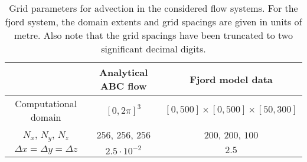 \begin{table}[htpb]
    \centering
    \caption[Grid parameters for advection in the considered flow systems]
    {Grid parameters for advection in the considered flow systems. For the
        fjord system, the domain extents and grid spacings are given in
        units of metre. Also note that the grid spacings have been truncated
        to two significant decimal digits.
    }
    \label{tab:gridparams}
    \begin{tabular}{ccc}
        \toprule
        & Analytical ABC flow & Fjord model data\\
        \midrule
        Computational domain %
        & $[0,2\pi]^{3}$ %
        & $[0,500]\times[0,500]\times[50,300]$\\
        $N_{x}$, $N_{y}$, $N_{z}$ %
        & $256$, $256$, $256$ %
        & $200$, $200$, $100$\\
        $\Delta{x} = \Delta{y} = \Delta{z}$ %
        & $2.5\cdot10^{-2}$ %
        & $2.5$\\
        \bottomrule
    \end{tabular}
\end{table}
